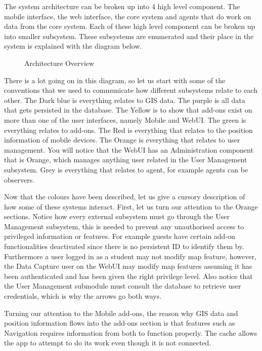 The system architecture can be broken up into 4 high level component. The mobile interface, the web interface, the core system and agents that do work on data from the core system. Each of these high level component can be broken up into smaller subsystem. These subsystems are enumerated and their place in the system is explained with the diagram below.

\begin{figure}[h]
\caption{Architecture Overview}
\end{figure}
There is a lot going on in this diagram, so let us start with some of the conventions that we used to communicate how different subsystems relate to each other. The Dark blue is everything relates to GIS data. The purple is all data that gets persisted in the database. The Yellow is to show that add-ons exist on more than one of the user interfaces, namely Mobile and WebUI. The green is everything relates to add-ons. The Red is everything that relates to the position information of mobile devices. The Orange is everything that relates to user management. You will notice that the WebUI has an Administration component that is Orange, which manages anything user related in the User Management subsystem. Grey is everything that relates to agent, for example agents can be observers.\par
\bigskip
\noindent
Now that the colours have been described, let us give a cursory description of how some of these systems interact. First, let us  turn our attention to the Orange sections. Notice how every external subsystem must go through the User Management subsystem, this is needed to prevent any unauthorised access to privileged information or features. For example guests have certain add-on functionalities deactivated since there is no persistent ID to identify them by. Furthermore a user logged in as a student may not modify map feature, however, the Data Capture user on the WebUI may modify map features assuming it has been authenticated and has been given the right privilege level. Also notice that the User Management submodule must consult the database to retrieve user credentials, which is why the arrows go both ways.\par\noindent
Turning our attention to the Mobile add-ons, the reason why GIS data and position information flows into the add-ons section is that features such as Navigation requires information from both to function properly. The cache allows the app to attempt to do its work even though it is not connected.\par\noindent
